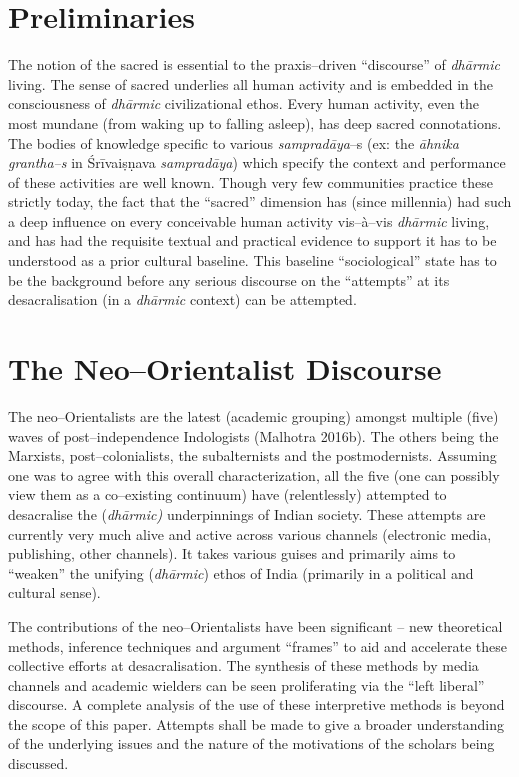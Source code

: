 \section*{Preliminaries}

The notion of the sacred is essential to the praxis–driven “discourse” of \textit{dhārmic} living. The sense of sacred underlies all human activity and is embedded in the consciousness of \textit{dhārmic} civilizational ethos. Every human activity, even the most mundane (from waking up to falling asleep), has deep sacred connotations. The bodies of knowledge specific to various \textit{sampradāya}–s (ex: the \textit{āhnika grantha–s} in Śrīvaiṣṇava \textit{sampradāya}) which specify the context and performance of these activities are well known. Though very few communities practice these strictly today, the fact that the “sacred” dimension has (since millennia) had such a deep influence on every conceivable human activity vis–à–vis \textit{dhārmic} living, and has had the requisite textual and practical evidence to support it has to be understood as a prior cultural baseline. This baseline “sociological” state has to be the background before any serious discourse on the “attempts” at its desacralisation (in a \textit{dhārmic} context) can be attempted.


\section*{The Neo–Orientalist Discourse}

The neo–Orientalists are the latest (academic grouping) amongst multiple (five) waves of post–independence Indologists (Malhotra 2016b). The others being the Marxists, post–colonialists, the subalternists and the postmodernists. Assuming one was to agree with this overall characterization, all the five (one can possibly view them as a co–existing continuum) have (relentlessly) attempted to desacralise the (\textit{dhārmic)} underpinnings of Indian society. These attempts are currently very much alive and active across various channels (electronic media, publishing, other channels). It takes various guises and primarily aims to “weaken” the unifying (\textit{dhārmic}) ethos of India (primarily in a political and cultural sense).

The contributions of the neo–Orientalists have been significant – new theoretical methods, inference techniques and argument “frames” to aid and accelerate these collective efforts at desacralisation. The synthesis of these methods by media channels and academic wielders can be seen proliferating via the “left liberal” discourse. A complete analysis of the use of these interpretive methods is beyond the scope of this paper. Attempts shall be made to give a broader understanding of the underlying issues and the nature of the motivations of the scholars being discussed.

